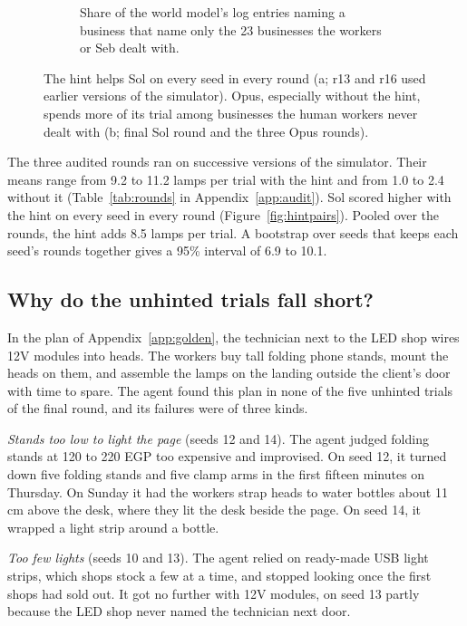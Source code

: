 \documentclass[10pt]{article}
\begin{document}
\begin{figure}[t]
\begin{subfigure}[b]{0.49\linewidth}
    \caption{Share of the world model's log entries naming a business that name only the 23 businesses the workers or Seb dealt with.}
    \label{fig:coverage}
  \end{subfigure}
  \caption{The hint helps Sol on every seed in every round (a; r13 and r16 used earlier versions of the simulator). Opus, especially without the hint, spends more of its trial among businesses the human workers never dealt with (b; final Sol round and the three Opus rounds).}
  \label{fig:pairscov}
\end{figure}

The three audited rounds ran on successive versions of the simulator. Their means range from 9.2 to 11.2 lamps per trial with the hint and from 1.0 to 2.4 without it (Table~\ref{tab:rounds} in Appendix~\ref{app:audit}). Sol scored higher with the hint on every seed in every round (Figure~\ref{fig:hintpairs}). Pooled over the rounds, the hint adds 8.5 lamps per trial. A bootstrap over seeds that keeps each seed's rounds together gives a 95\% interval of 6.9 to 10.1.

\subsection{Why do the unhinted trials fall short?}
\label{sec:shortfall}

In the plan of Appendix~\ref{app:golden}, the technician next to the LED shop wires 12V modules into heads. The workers buy tall folding phone stands, mount the heads on them, and assemble the lamps on the landing outside the client's door with time to spare. The agent found this plan in none of the five unhinted trials of the final round, and its failures were of three kinds.

\emph{Stands too low to light the page} (seeds 12 and 14). The agent judged folding stands at 120 to 220 EGP too expensive and improvised. On seed 12, it turned down five folding stands and five clamp arms in the first fifteen minutes on Thursday. On Sunday it had the workers strap heads to water bottles about 11\,cm above the desk, where they lit the desk beside the page. On seed 14, it wrapped a light strip around a bottle.

\emph{Too few lights} (seeds 10 and 13). The agent relied on ready-made USB light strips, which shops stock a few at a time, and stopped looking once the first shops had sold out. It got no further with 12V modules, on seed 13 partly because the LED shop never named the technician next door.
\end{document}
